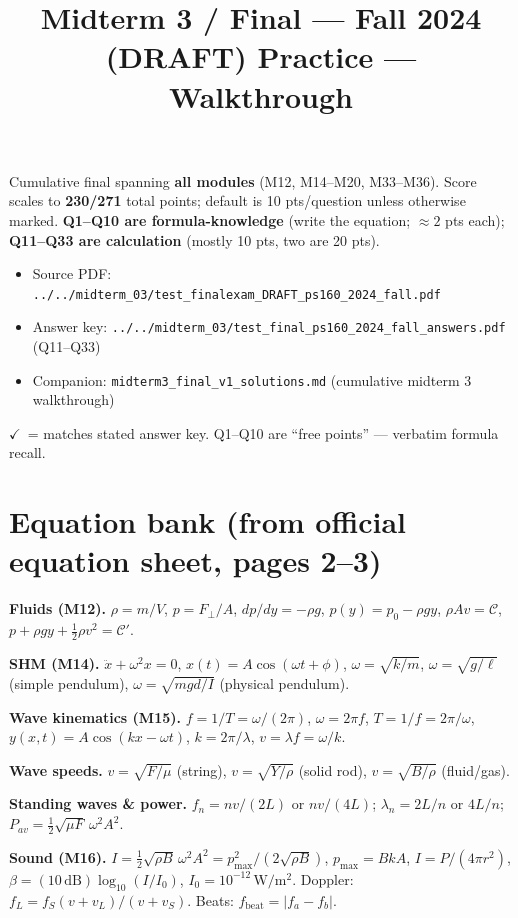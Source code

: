 \documentclass[11pt]{article}
\title{Midterm 3 / Final --- Fall 2024 (DRAFT) Practice --- Walkthrough}
\author{}\date{}
\newcommand{\checkmk}{\ensuremath{\checkmark}}
\begin{document}
\maketitle

Cumulative final spanning \textbf{all modules} (M12, M14--M20, M33--M36). Score scales to \textbf{230/271} total points; default is 10 pts/question unless otherwise marked. \textbf{Q1--Q10 are formula-knowledge} (write the equation; ${\approx}2$ pts each); \textbf{Q11--Q33 are calculation} (mostly 10 pts, two are 20 pts).

\begin{itemize}[leftmargin=*]
\item Source PDF: \texttt{../../midterm\_03/test\_finalexam\_DRAFT\_ps160\_2024\_fall.pdf}
\item Answer key: \texttt{../../midterm\_03/test\_final\_ps160\_2024\_fall\_answers.pdf} (Q11--Q33)
\item Companion: \texttt{midterm3\_final\_v1\_solutions.md} (cumulative midterm 3 walkthrough)
\end{itemize}

\noindent\checkmk\ = matches stated answer key. Q1--Q10 are ``free points'' --- verbatim formula recall.

\section*{Equation bank (from official equation sheet, pages 2--3)}

\textbf{Fluids (M12).} \(\rho = m/V\), \(p = F_\perp/A\), \(dp/dy = -\rho g\), \(p(y) = p_0 - \rho g y\), \(\rho A v = \mathcal{C}\), \(p + \rho g y + \tfrac12\rho v^2 = \mathcal{C}'\).

\textbf{SHM (M14).} \(\ddot x + \omega^2 x = 0\), \(x(t)=A\cos(\omega t+\phi)\), \(\omega=\sqrt{k/m}\), \(\omega=\sqrt{g/\ell}\) (simple pendulum), \(\omega=\sqrt{mgd/I}\) (physical pendulum).

\textbf{Wave kinematics (M15).} \(f=1/T=\omega/(2\pi)\), \(\omega=2\pi f\), \(T=1/f=2\pi/\omega\), \(y(x,t)=A\cos(kx-\omega t)\), \(k=2\pi/\lambda\), \(v=\lambda f=\omega/k\).

\textbf{Wave speeds.} \(v=\sqrt{F/\mu}\) (string), \(v=\sqrt{Y/\rho}\) (solid rod), \(v=\sqrt{B/\rho}\) (fluid/gas).

\textbf{Standing waves \& power.} \(f_n = nv/(2L)\) or \(nv/(4L)\); \(\lambda_n=2L/n\) or \(4L/n\); \(P_{av}=\tfrac12\sqrt{\mu F}\,\omega^2 A^2\).

\textbf{Sound (M16).} \(I=\tfrac12\sqrt{\rho B}\,\omega^2 A^2 = p_{\max}^2/(2\sqrt{\rho B})\), \(p_{\max}=BkA\), \(I=P/(4\pi r^2)\), \(\beta=(10\,\mathrm{dB})\log_{10}(I/I_0)\), \(I_0=10^{-12}\,\mathrm{W/m^2}\). Doppler: \(f_L=f_S(v+v_L)/(v+v_S)\). Beats: \(f_{\mathrm{beat}}=|f_a-f_b|\).
\end{document}
